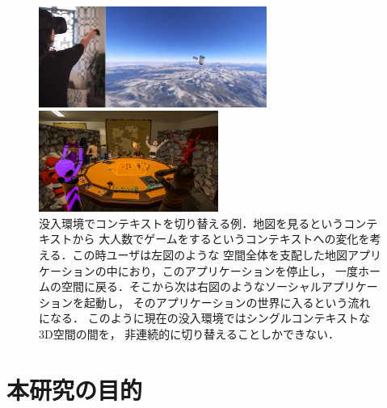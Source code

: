 \begin{figure}[htbp]
  \begin{minipage}[t]{0.55\linewidth}
    \captionsetup[sub]{margin=0.1cm}
    \centering
    \includegraphics[keepaspectratio, height=1.3in]{figures/google-earth.png}
  \end{minipage}
  \begin{minipage}[t]{0.43\linewidth}
    \captionsetup[sub]{margin=0.1cm}
    \centering
    \includegraphics[keepaspectratio, height=1.3in]{figures/vrc.png}
  \end{minipage}
  \caption{
    没入環境でコンテキストを切り替える例．地図を見るというコンテキストから
    大人数でゲームをするというコンテキストへの変化を考える．この時ユーザは左図のような
    空間全体を支配した地図アプリケーションの中におり，このアプリケーションを停止し，
    一度ホームの空間に戻る．そこから次は右図のようなソーシャルアプリケーションを起動し，
    そのアプリケーションの世界に入るという流れになる．
    このように現在の没入環境ではシングルコンテキストな3D空間の間を，
    非連続的に切り替えることしかできない．
  }
  \label{fig:switching-app}
\end{figure}



\section{本研究の目的}

